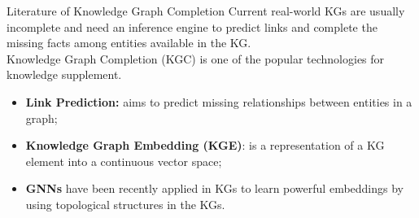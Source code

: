 \begin{tframe}{Literature of Knowledge Graph Completion}
\vspace{-.3cm}
Current real-world KGs are usually incomplete and need an inference engine to predict links and complete the missing facts among entities available in the KG.
\newline
\\Knowledge Graph Completion (KGC) is one of the popular technologies for knowledge supplement. 
\vspace{0.1cm}

\begin{itemize}
    \item \textbf{Link Prediction:} aims to predict missing relationships between entities in a graph;
    
    \item \textbf{Knowledge Graph Embedding (KGE)}: is a representation of a KG element into a continuous vector space;
    \item \textbf{GNNs} have been recently applied in KGs to learn powerful embeddings by using topological structures in the KGs.
\end{itemize}
\end{tframe}